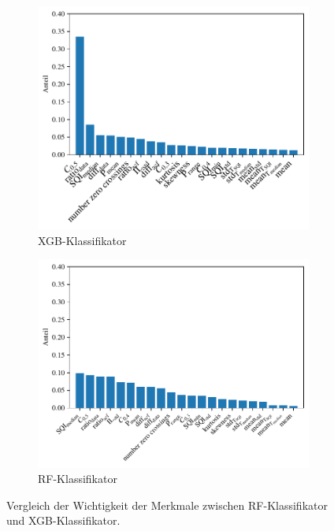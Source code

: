  \begin{figure}[h]
 	\centering
		\begin{subfigure}{.49\textwidth}
			\centering
 			\includegraphics[width=\textwidth]{pic/xgb-clf-final-importances.pdf}
 			\caption{\ac{XGB}-Klassifikator}
 		\end{subfigure}
    	\begin{subfigure}{.49\textwidth}
    		\centering
 			\includegraphics[width=\textwidth]{pic/rf-clf-final-importances.pdf}
 			\caption{\ac{RF}-Klassifikator}
 		\end{subfigure}
 	\caption{Vergleich der Wichtigkeit der Merkmale zwischen \ac{RF}-Klassifikator und \ac{XGB}-Klassifikator.}
 	\label{fig:importances-comparison-rf-xgb-clf}
 \end{figure}

